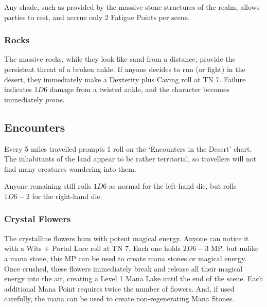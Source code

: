 \begin{multicols}{2}
Any shade, such as provided by the massive stone structures of the realm, allows parties to rest, and accrue only 2 Fatigue Points per scene.

\subsubsection{Rocks}

The massive rocks, while they look like sand from a distance, provide the persistent threat of a broken ankle.
If anyone decides to run (or fight) in the desert, they immediately make a Dexterity plus Caving roll at TN 7.
Failure indicates $1D6$ damage from a twisted ankle, and the character becomes immediately \emph{prone}.

\subsection{Encounters}

Every 5 miles travelled prompts 1 roll on the `Encounters in the Desert' chart.
The inhabitants of the land appear to be rather territorial, so travellers will not find many creatures wandering into them.

Anyone remaining still rolls $1D6$ as normal for the left-hand die,%
but rolls $1D6-2$ for the right-hand die.


\subsubsection{Crystal Flowers}
\label{crystalFlowers}

The crystalline flowers hum with potent magical energy.
Anyone can notice it with a Wits + Portal Lore roll at TN 7.
Each one holds $2D6-3$ MP, but unlike a mana stone, this MP can be used to create mana stones or magical energy.
Once crushed, these flowers immediately break and release all their magical energy into the air, creating a Level 1 Mana Lake until the end of the scene.
Each additional Mana Point requires twice the number of flowers.
And, if used carefully, the mana can be used to create non-regenerating Mana Stones.



\end{multicols}
